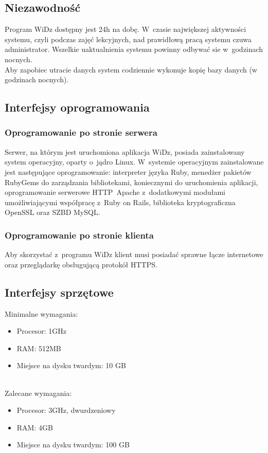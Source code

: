 \documentclass[12pt,leqno,twoside]{mwart}
\begin{document}
\subsection{Niezawodność}
\noindent Program WiDz dostępny jest 24h na dobę. W~czasie największej aktywności systemu, czyli podczas zajęć lekcyjnych, nad prawidłową pracą systemu czuwa administrator. Wszelkie uaktualnienia systemu powinny odbywać sie w~godzinach nocnych.\\
\indent Aby zapobiec utracie danych system codziennie wykonuje kopię bazy danych (w godzinach nocnych).

\subsection{Interfejsy oprogramowania}
\subsubsection{Oprogramowanie po stronie serwera}
\noindent Serwer, na którym jest uruchomiona aplikacja WiDz, posiada zainstalowany system operacyjny, oparty o~jądro Linux. W~systemie operacyjnym zainstalowane jest następujące oprogramowanie: interpreter języka Ruby, menedżer pakietów RubyGems do zarządzania bibliotekami, koniecznymi do uruchomienia aplikacji, oprogramowanie serwerowe HTTP~Apache z~dodatkowymi modułami umożliwiającymi współpracę z~Ruby on Rails, biblioteka kryptograficzna OpenSSL oraz SZBD MySQL.

\subsubsection{Oprogramowanie po stronie klienta}
\noindent Aby skorzystać z~programu WiDz klient musi posiadać sprawne łącze internetowe oraz przeglądarkę obsługującą protokół HTTPS.

\subsection{Interfejsy sprzętowe}
\noindent Minimalne wymagania:
\begin{itemize}
	\item Procesor: 1GHz
	\item RAM: 512MB
	\item Miejsce na dysku twardym: 10 GB
\end{itemize}
\noindent \\
\noindent Zalecane wymagania:
\begin{itemize}
	\item Procesor: 3GHz, dwurdzeniowy
	\item RAM: 4GB
	\item Miejsce na dysku twardym: 100 GB
\end{itemize}
\end{document}
